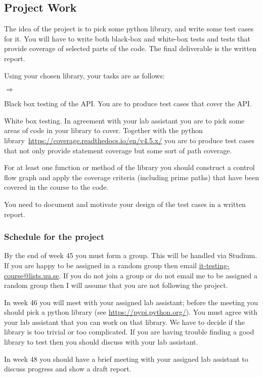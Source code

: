 \documentclass[a4paper]{article}
\begin{document}
\subsection*{Project Work}

The idea of the project is to pick some python library, and write some
test cases for it. You will have to write both black-box and white-box
tests and tests that provide coverage of selected parts of the
code. The final deliverable is the written report.%


Using your chosen library, your tasks are as follows:
\begin{list}{$\Rightarrow$}{} 
    \item  Black box testing of the API. You are to produce test cases
      that cover the API.
    \item White box testing. In agreement with your lab assistant you
      are to pick some areas of code in your library to
      cover. Together with the python
      library~\url{https://coverage.readthedocs.io/en/v4.5.x/} you are
      to produce test cases that not only provide statement coverage
      but some sort of path coverage.
    \item For at least one function or method of the library you
      should construct a control flow graph and apply the coverage
      criteria (including prime paths)
      that have been covered in the course to the code. 
    \item You need to document and motivate your design of the test cases in
      a written report. 
\end{list}


\subsubsection*{Schedule for the project}

\item By the end of  week 45 you must form a
    group. This will be handled via Studium.  If you are happy to be
    assigned in a random group then email
    \url{it-testing-course@lists.uu.se}. If you do not  join a group
    or do not email me to be assigned a random group then I will
    assume that you are not following the project. 
  \item In week 46 you will meet with  your assigned lab assistant; before
    the meeting you should pick a python library (see 
    \url{https://pypi.python.org/}). You must agree with your lab
    assistant that you can work on that library. We have to decide if
    the library is too trivial or too complicated. If you are having
    trouble finding a good library to test then you should discuss
    with your lab assistant. 
  \item In week  48 you should have a brief meeting with your assigned lab
    assistant to discuss progress and show a draft report. 
\end{document}
